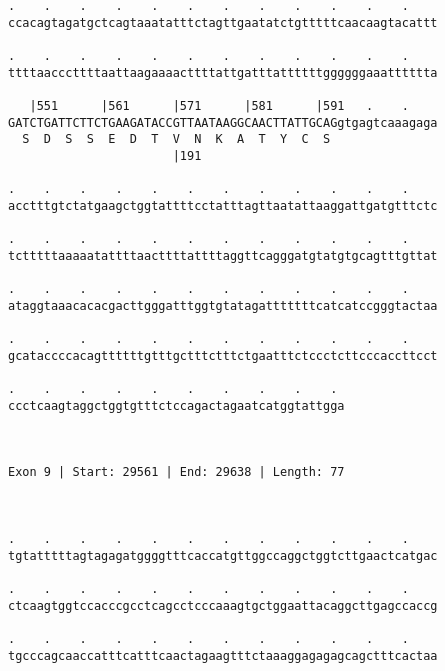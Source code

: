 \documentclass{article}
\begin{document}
\begin{Verbatim}
.    .    .    .    .    .    .    .    .    .    .    .    
ccacagtagatgctcagtaaatatttctagttgaatatctgtttttcaacaagtacattt
                                                            
.    .    .    .    .    .    .    .    .    .    .    .    
ttttaacccttttaattaagaaaacttttattgatttattttttggggggaaatttttta
                                                            
   |551      |561      |571      |581      |591   .    .    
GATCTGATTCTTCTGAAGATACCGTTAATAAGGCAACTTATTGCAGgtgagtcaaagaga
  S  D  S  S  E  D  T  V  N  K  A  T  Y  C  S               
                       |191                                 
  
.    .    .    .    .    .    .    .    .    .    .    .    
acctttgtctatgaagctggtattttcctatttagttaatattaaggattgatgtttctc
                                                            
.    .    .    .    .    .    .    .    .    .    .    .    
tctttttaaaaatattttaacttttattttaggttcagggatgtatgtgcagtttgttat
                                                            
.    .    .    .    .    .    .    .    .    .    .    .    
ataggtaaacacacgacttgggatttggtgtatagatttttttcatcatccgggtactaa
                                                            
.    .    .    .    .    .    .    .    .    .    .    .    
gcataccccacagttttttgtttgctttctttctgaatttctccctcttcccaccttcct
                                                            
.    .    .    .    .    .    .    .    .    . 
ccctcaagtaggctggtgtttctccagactagaatcatggtattgga
                                               
                                               
 
Exon 9 | Start: 29561 | End: 29638 | Length: 77



.    .    .    .    .    .    .    .    .    .    .    .    
tgtatttttagtagagatggggtttcaccatgttggccaggctggtcttgaactcatgac
                                                            
.    .    .    .    .    .    .    .    .    .    .    .    
ctcaagtggtccacccgcctcagcctcccaaagtgctggaattacaggcttgagccaccg
                                                            
.    .    .    .    .    .    .    .    .    .    .    .    
tgcccagcaaccatttcatttcaactagaagtttctaaaggagagagcagctttcactaa
                                                            

\end{Verbatim}
\end{document}

